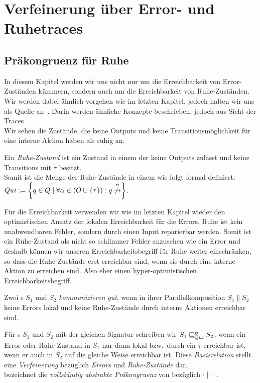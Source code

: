 \chapter{Verfeinerung über Error- und Ruhetraces}

\section{Präkongruenz für Ruhe}

In diesem Kapitel werden wir uns nicht nur um die Erreichbarkeit von
Error-Zuständen kümmern, sondern auch um die Erreichbarkeit von
Ruhe-Zuständen. Wir werden dabei ähnlich vorgehen wie im letzten Kapitel,
jedoch halten wir uns als Quelle an~\cite{Chilton2013}. Darin werden ähnliche
Konzepte beschrieben, jedoch aus Sicht der Traces.\\
Wir sehen die Zustände, die keine Outputs und keine Transitionsmöglichkeit für
eine interne Aktion haben als ruhig an.

\begin{Def}[Ruhe]
  Ein \emph{Ruhe-Zustand} ist ein Zustand in einem \EIO{} der keine
  Outputs zulässt und keine Transitions mit $\tau$ besitzt.\\
  Somit ist die Menge der Ruhe-Zustände in einem \EIO{} wie folgt formal
  definiert: $Qui:=\left\{q\in Q\mid \forall \alpha\in (O\cup \{\tau\}): q
  \overset{\alpha}{\not{\hspace{-0.1cm}\rightarrow}}\right\}$.
\end{Def}

Für die Erreichbarkeit verwenden wir wie im letzten Kapitel wieder den
optimistischen Ansatz der lokalen Erreichbarkeit für die Errors. Ruhe ist kein
unabwendbaren Fehler, sondern durch einen Input reparierbar werden. Somit ist
ein Ruhe-Zustand als nicht so schlimmer Fehler anzusehen wie ein Error und
deshalb können wir unseren Erreichbarkeitsbegriff für Ruhe weiter einschränken,
so dass die Ruhe-Zustände erst erreichbar sind, wenn sie durch eine interne
Aktion zu erreichen sind. Also eher einen hyper-optimistischen
Erreichbarkeitsbegriff.

\begin{Def}
  Zwei \EIO{}s $S_1$ und $S_2$ \emph{kommunizieren gut}, wenn in ihrer
  Parallelkomposition $S_1\| S_2$ keine Errors lokal und keine Ruhe-Zustände
  durch interne Aktionen erreichbar sind.
\end{Def}

\begin{Def}
  Für \EIO{}s $S_1$ und $S_2$ mit der gleichen Signatur schreiben wir
  $S_1\sqsubseteq _{Qui}^B S_2$, wenn ein Error oder Ruhe-Zustand in $S_1$ nur dann lokal
  bzw.\ durch ein $\tau$ erreichbar ist, wenn er auch in $S_2$ auf die gleiche
  Weise erreichbar ist. Diese \emph{Basisrelation} stellt eine \emph{Verfeinerung}
  bezüglich \emph{Errors} und \emph{Ruhe-Zustände} dar.\\
  \QCRel{} bezeichnet die \emph{vollständig abstrakte Präkongruenz} von
  \QBRel{} bezüglich $\cdot\|\cdot$.
\end{Def}

